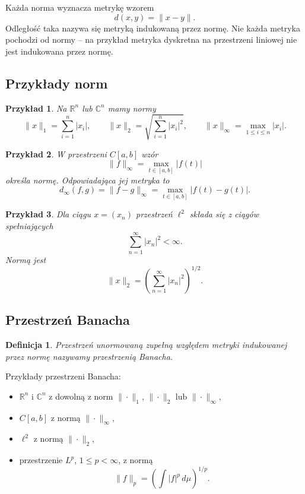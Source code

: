\documentclass{article}
\newtheorem{definicja}{Definicja}
\newtheorem{przyklad}{Przykład}
\begin{document}
Każda norma wyznacza metrykę wzorem
\[
d(x,y)=\|x-y\|.
\]
Odległość taka nazywa się metryką indukowaną przez normę. Nie każda metryka pochodzi od normy -- na przykład metryka dyskretna na przestrzeni liniowej nie jest indukowana przez normę.

\subsection{Przykłady norm}

\begin{przyklad}
Na $\mathbb R^n$ lub $\mathbb C^n$ mamy normy
\[
\|x\|_1=\sum_{i=1}^n|x_i|,
\qquad
\|x\|_2=\sqrt{\sum_{i=1}^n|x_i|^2},
\qquad
\|x\|_\infty=\max_{1\leq i\leq n}|x_i|.
\]
\end{przyklad}

\begin{przyklad}
W przestrzeni $C[a,b]$ wzór
\[
\|f\|_\infty=\max_{t\in[a,b]}|f(t)|
\]
określa normę. Odpowiadająca jej metryka to
\[
d_\infty(f,g)=\|f-g\|_\infty=\max_{t\in[a,b]}|f(t)-g(t)|.
\]
\end{przyklad}

\begin{przyklad}
Dla ciągu $x=(x_n)$ przestrzeń $\ell^2$ składa się z ciągów spełniających
\[
\sum_{n=1}^{\infty}|x_n|^2<\infty.
\]
Normą jest
\[
\|x\|_2=\left(\sum_{n=1}^{\infty}|x_n|^2\right)^{1/2}.
\]
\end{przyklad}

\subsection{Przestrzeń Banacha}
\begin{definicja}
Przestrzeń unormowaną zupełną względem metryki indukowanej przez normę nazywamy przestrzenią Banacha.
\end{definicja}

Przykłady przestrzeni Banacha:
\begin{itemize}
    \item $\mathbb R^n$ i $\mathbb C^n$ z dowolną z norm $\|\cdot\|_1$, $\|\cdot\|_2$ lub $\|\cdot\|_\infty$,
    \item $C[a,b]$ z normą $\|\cdot\|_\infty$,
    \item $\ell^2$ z normą $\|\cdot\|_2$,
    \item przestrzenie $L^p$, $1\leq p<\infty$, z normą
    \[
    \|f\|_p=\left(\int |f|^p\,d\mu\right)^{1/p}.
    \]
\end{itemize}
\end{document}
